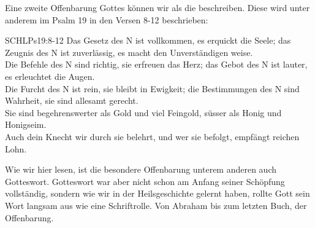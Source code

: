\begin{otsblock}
    Eine zweite Offenbarung Gottes können wir als die  beschreiben. Diese wird unter anderem im Psalm 19 in den Versen 8-12 beschrieben:
    \begin{bibelbox}{SCHL}{Ps}{19:8-12}
        Das Gesetz des \herr N ist vollkommen, es erquickt die Seele; das Zeugnis des \herr N ist zuverlässig, es macht den Unverständigen weise.\\
        Die Befehle des \herr N sind richtig, sie erfreuen das Herz; das Gebot des \herr N ist lauter, es erleuchtet die Augen.\\
        Die Furcht des \herr N ist rein, sie bleibt in Ewigkeit; die Bestimmungen des \herr N sind Wahrheit, sie sind allesamt gerecht.\\
        Sie sind begehrenswerter als Gold und viel Feingold, süsser als Honig und Honigseim.\\
        Auch dein Knecht wir durch sie belehrt, und wer sie befolgt, empfängt reichen Lohn.
    \end{bibelbox}
    Wie wir hier lesen, ist die besondere Offenbarung unterem anderen auch Gotteswort. Gotteswort war aber nicht schon am Anfang seiner Schöpfung vollständig, sondern wie wir in der Heilsgeschichte gelernt haben, rollte Gott sein Wort langsam aus wie eine Schriftrolle. Von Abraham bis zum letzten Buch, der Offenbarung.


\end{otsblock}
